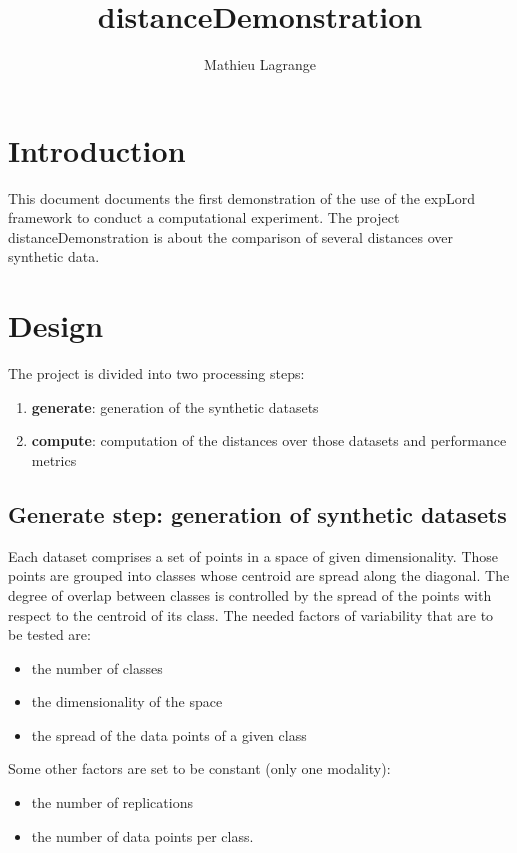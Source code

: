 \documentclass[12pt,a4paper,fleqn]{tufte-handout}
\title{distanceDemonstration}
\author{ Mathieu Lagrange }
\begin{document}
 
  
\maketitle 
  

\section{Introduction}

This document documents the first demonstration of the use of the expLord framework to conduct a computational experiment. The project distanceDemonstration is about the comparison of several distances over synthetic data.



\section{Design}

 The project is divided into two processing steps:
\begin{enumerate}
\item \textbf{generate}: generation of the synthetic datasets
\item \textbf{compute}: computation of the distances over those datasets and performance metrics
\end{enumerate}

\subsection{\textbf{Generate step}: generation of synthetic datasets}

Each dataset comprises a set of points in a space of given dimensionality. Those points are grouped into classes whose centroid are spread along the diagonal. The degree of overlap between classes is controlled by the spread of the points with respect to the centroid of its class. The needed factors of variability that are to be tested are:
\begin{itemize}
\item the number of classes
\item the dimensionality of the space
\item the spread of the data points of a given class
\end{itemize}
Some other factors are set to be constant (only one modality):
\begin{itemize}
\item the number of replications
\item the number of data points per class.
\end{itemize}
\end{document}
